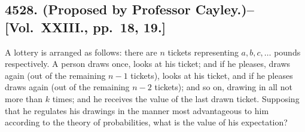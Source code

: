 \documentclass[11pt,a4paper]{article}
\theoremstyle{definition}
\begin{document}
\subsection*{4528. (Proposed by Professor Cayley.)\---[Vol.~XXIII., pp.~18, 19.]}

A lottery is arranged as follows: there are $n$ tickets representing $a,b,c,\ldots$ pounds respectively. A person draws once, looks at his ticket; and if he pleases, draws again (out of the remaining $n-1$ tickets), looks at his ticket, and if he pleases draws again (out of the remaining $n-2$ tickets); and so on, drawing in all not more than $k$ times; and he receives the value of the last drawn ticket. Supposing that he regulates his drawings in the manner most advantageous to him according to the theory of probabilities, what is the value of his expectation?
\end{document}
